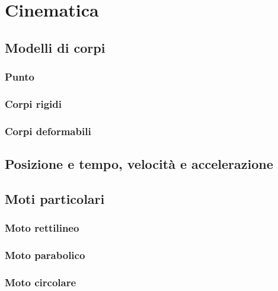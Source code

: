 
\chapter{Cinematica}

\section{Modelli di corpi}
\subsection{Punto}
\subsection{Corpi rigidi}
\subsection{Corpi deformabili}

\section{Posizione e tempo, velocità e accelerazione}

\section{Moti particolari}
\subsection{Moto rettilineo}
\subsection{Moto parabolico}
\subsection{Moto circolare}
